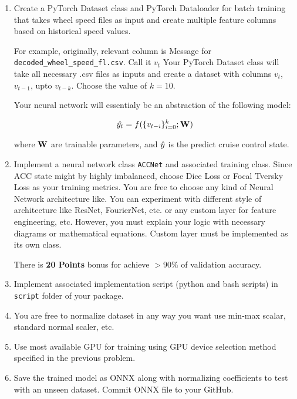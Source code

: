 \documentclass[12pt, xcolor=dvipsnames,svgnames,x11names]{article}
\begin{document}
\begin{enumerate}
\item Create a PyTorch Dataset class and PyTorch Dataloader for batch training that takes wheel speed files as input and create multiple feature columns based on historical speed values.

For example, originally, relevant column is Message for \texttt{decoded\_wheel\_speed\_fl.csv}. Call it $v_t$  Your PyTorch Dataset class will take all necessary .csv files as inputs and create a dataset with columns $v_t$, $v_{t-1}$, upto $v_{t-k}$. Choose the value of $k = 10$.

Your neural network will essentialy be an abstraction of the following model:

\begin{align*}
\hat{y_t} = f(\{v_{t-i}\}_{i=0}^k; {\mathbf W})
\end{align*}

where ${\mathbf W}$ are trainable parameters, and ${\hat y}$ is the predict cruise control state.


\item Implement a neural network class \texttt{ACCNet} and associated training class. Since ACC state might by highly imbalanced, choose Dice Loss or Focal Tversky Loss as your training metrics. You are free to choose any kind of Neural Network architecture like. You can experiment with different style of architecture like ResNet, FourierNet, etc. or any custom layer for feature engineering, etc. However, you must explain your logic with necessary diagrams or mathematical equations. Custom layer must be implemented as its own class.

There is \textbf{20 Points} bonus for achieve $>90\%$ of validation accuracy.

\item Implement associated implementation script (python and bash scripts) in \texttt{script} folder of your package.

\item You are free to normalize dataset in any way you want use min-max scalar, standard normal scaler, etc.

\item Use most available GPU for training using GPU device selection method specified in the previous problem.

\item Save the trained model as ONNX along with normalizing coefficients to test with an unseen dataset. Commit ONNX file to your GitHub.


\end{enumerate}
\end{document}
